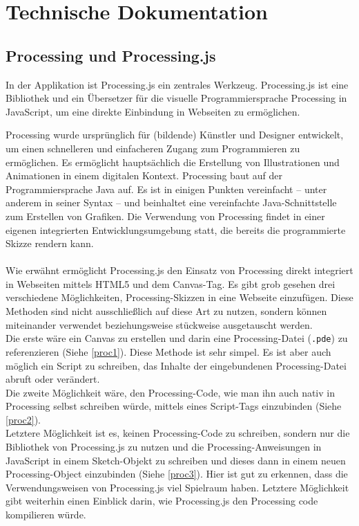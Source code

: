 \documentclass[12pt, ngerman, utf8]{article}
\begin{document}
\section{Technische Dokumentation}
\subsection{Processing und Processing.js}
In der Applikation ist Processing.js ein zentrales Werkzeug. Processing.js ist eine Bibliothek und ein Übersetzer für die visuelle Programmiersprache Processing in JavaScript, um eine direkte Einbindung in Webseiten zu ermöglichen. 

Processing wurde ursprünglich für (bildende) Künstler und Designer entwickelt, um einen schnelleren und einfacheren Zugang zum Programmieren zu ermöglichen. Es ermöglicht hauptsächlich die Erstellung von Illustrationen und Animationen in einem digitalen Kontext. Processing baut auf der Programmiersprache Java auf. Es ist in einigen Punkten vereinfacht – unter anderem in seiner Syntax – und beinhaltet eine vereinfachte Java-Schnittstelle zum Erstellen von Grafiken. Die Verwendung von Processing findet in einer eigenen integrierten Entwicklungsumgebung statt, die bereits die programmierte Skizze rendern kann.\\\\
Wie erwähnt ermöglicht Processing.js den Einsatz von Processing direkt integriert in Webseiten mittels HTML5 und dem Canvas-Tag. Es gibt grob gesehen drei verschiedene Möglichkeiten, Processing-Skizzen in eine Webseite einzufügen. Diese Methoden sind nicht ausschließlich auf diese Art zu nutzen, sondern können miteinander verwendet beziehungsweise stückweise ausgetauscht werden.\\
Die erste wäre ein Canvas zu erstellen und darin eine Processing-Datei (\texttt{.pde}) zu referenzieren (Siehe \ref{proc1}). Diese Methode ist sehr simpel. Es ist aber auch möglich ein Script zu schreiben, das Inhalte der eingebundenen Processing-Datei abruft oder verändert.\\
Die zweite Möglichkeit wäre, den Processing-Code, wie man ihn auch nativ in Processing selbst schreiben würde, mittels eines Script-Tags einzubinden (Siehe \ref{proc2}).\\
Letztere Möglichkeit ist es, keinen Processing-Code zu schreiben, sondern nur die Bibliothek von Processing.js zu nutzen und die Processing-Anweisungen in JavaScript in einem Sketch-Objekt zu schreiben und dieses dann in einem neuen Processing-Object einzubinden (Siehe \ref{proc3}). Hier ist gut zu erkennen, dass die Verwendungsweisen von Processing.js viel Spielraum haben. Letztere Möglichkeit gibt weiterhin einen Einblick darin, wie Processing.js den Processing code kompilieren würde. \\\\
\end{document}

